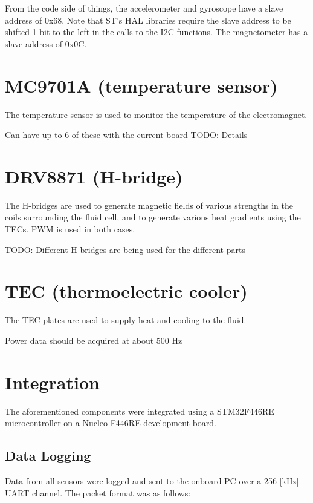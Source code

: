 \documentclass{article}
\begin{document}
\clearpage

From the code side of things, the accelerometer and gyroscope have a slave address of 0x68. Note that ST's HAL libraries require the slave address to be shifted 1 bit to the left in the calls to the I2C functions. The magnetometer has a slave address of 0x0C.

\clearpage

%
%
%
%

\section{MC9701A (temperature sensor)} \label{tempsensor}
The temperature sensor is used to monitor the temperature of the electromagnet.

Can have up to 6 of these with the current board
TODO: Details
\clearpage

%
%
%
%

\section{DRV8871 (H-bridge)} \label{hbridge}
The H-bridges are used to generate magnetic fields of various strengths in the coils surrounding the fluid cell, and to generate various heat gradients using the TECs. PWM is used in both cases.

TODO: Different H-bridges are being used for the different parts
\clearpage

%
%
%
%

\section{TEC (thermoelectric cooler)} \label{18B20}
The TEC plates are used to supply heat and cooling to the fluid.

Power data should be acquired at about 500 Hz
\clearpage

%
%
%
%

\section{Integration} \label{integration}
The aforementioned components were integrated using a STM32F446RE microcontroller on a Nucleo-F446RE development board.

\subsection{Data Logging}
Data from all sensors were logged and sent to the onboard PC over a 256 [kHz] UART channel. The packet format was as follows:
\end{document}
